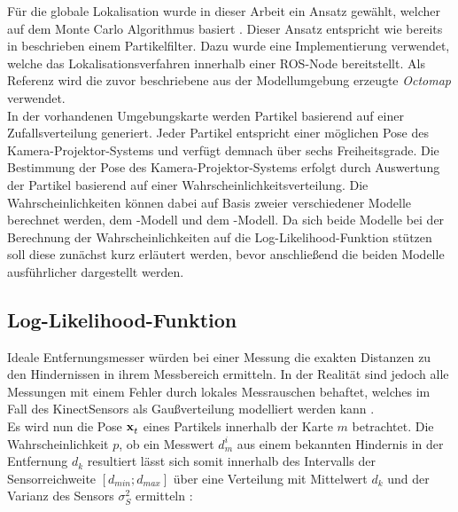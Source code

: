 Für die globale Lokalisation wurde in dieser Arbeit ein Ansatz gewählt, welcher auf dem Monte Carlo Algorithmus basiert \cite{Dellaert1999}. Dieser Ansatz entspricht wie bereits in  beschrieben einem Partikelfilter. \red[Begründung! ]
Dazu wurde eine Implementierung \cite{humanoidNavigation} verwendet, welche das Lokalisationsverfahren innerhalb einer ROS-Node bereitstellt. Als Referenz wird die zuvor beschriebene aus der Modellumgebung erzeugte \textit{Octomap} verwendet. \\

In der vorhandenen Umgebungskarte werden Partikel basierend auf einer Zufallsverteilung generiert. Jeder Partikel entspricht einer möglichen Pose des Kamera-Projektor-Systems und verfügt demnach über sechs Freiheitsgrade. Die Bestimmung der Pose des Kamera-Projektor-Systems erfolgt durch Auswertung der Partikel basierend auf einer Wahrscheinlichkeitsverteilung. Die Wahrscheinlichkeiten können dabei auf Basis zweier verschiedener Modelle berechnet werden, dem \red[Endpoint]-Modell und dem \red[Raycasting]-Modell. Da sich beide Modelle bei der Berechnung der Wahrscheinlichkeiten auf die Log-Likelihood-Funktion stützen soll diese zunächst kurz erläutert werden, bevor anschließend die beiden Modelle ausführlicher dargestellt werden.

\subsection{Log-Likelihood-Funktion}
\label{chap.loglik}
Ideale Entfernungsmesser würden bei einer Messung die exakten Distanzen zu den Hindernissen in ihrem Messbereich ermitteln. In der Realität sind jedoch alle Messungen mit einem Fehler durch lokales Messrauschen behaftet, welches im Fall des Kinect\red[TM] Sensors als Gaußverteilung modelliert werden kann \cite{Nguyen2012}.\\

Es wird nun die Pose $\mathbf{x}^{}_{t}$ eines Partikels innerhalb der Karte $m$ betrachtet. Die Wahrscheinlichkeit $p$, ob ein Messwert $d_m^i$ aus einem bekannten Hindernis in der Entfernung $d_k$ resultiert lässt sich somit innerhalb des Intervalls der Sensorreichweite $[d_{min};d_{max}]$ über eine Verteilung mit Mittelwert $d_k$ und der Varianz des Sensors $\sigma_{S}^2$ ermitteln \cite{Thrun2005}:

